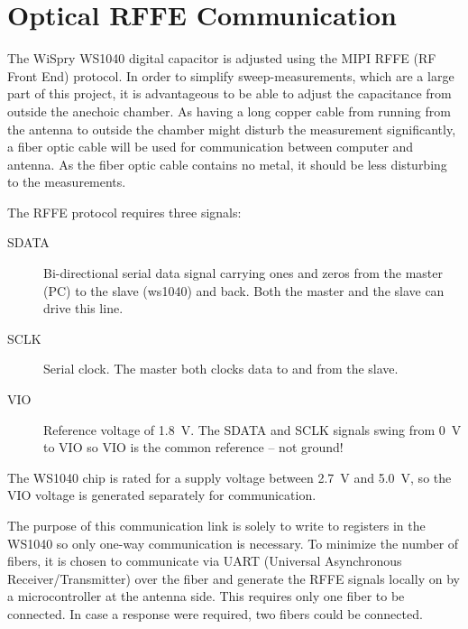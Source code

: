 \chapter{Optical RFFE Communication}
\label{cha:optical_rffe_comm}
The WiSpry WS1040 digital capacitor is adjusted using the MIPI RFFE (RF Front End) protocol. In order to simplify sweep-measurements, which are a large part of this project, it is advantageous to be able to adjust the capacitance from outside the anechoic chamber. As having a long copper cable from running from the antenna to outside the chamber might disturb the measurement significantly, a fiber optic cable will be used for communication between computer and antenna. As the fiber optic cable contains no metal, it should be less disturbing to the measurements.

The RFFE protocol requires three signals:
\begin{description}
    \item[SDATA] Bi-directional serial data signal carrying ones and zeros from the master (PC) to the slave (ws1040) and back. Both the master and the slave can drive this line.
    \item[SCLK] Serial clock. The master both clocks data to and from the slave.
    \item[VIO] Reference voltage of \SI{1.8}{V}. The SDATA and SCLK signals swing from \SI{0}{V} to VIO so VIO is the common reference -- not ground!
\end{description}
The WS1040 chip is rated for a supply voltage between \SI{2.7}{V} and \SI{5.0}{V}, so the VIO voltage is generated separately for communication.

The purpose of this communication link is solely to write to registers in the WS1040 so only one-way communication is necessary. To minimize the number of fibers, it is chosen to communicate via UART (Universal Asynchronous Receiver/Transmitter) over the fiber and generate the RFFE signals locally on by a microcontroller at the antenna side. This requires only one fiber to be connected. In case a response were required, two fibers could be connected.

